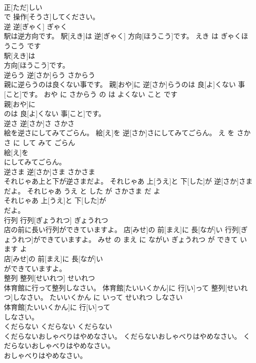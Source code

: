 \documentclass[8pt]{extreport}
\begin{document}
\begin{CJK}{UTF8}{min}
\\	正[ただ]しい
\\	で 操作[そうさ]してください。			
\\	逆	逆[ぎゃく]	ぎゃく	
\\	駅は逆方向です。	駅[えき]は 逆[ぎゃく] 方向[ほうこう]です。	えき は ぎゃくほうこう です	
\\	駅[えき]は
\\	方向[ほうこう]です。			
\\	逆らう	逆[さか]らう	さからう	
\\	親に逆らうのは良くない事です。	親[おや]に 逆[さか]らうのは 良[よ]くない 事[こと]です。	おや に さからう の は よくない こと です	
\\	親[おや]に
\\	のは 良[よ]くない 事[こと]です。			
\\	逆さ	逆[さか]さ	さかさ	
\\	絵を逆さにしてみてごらん。	絵[え]を 逆[さか]さにしてみてごらん。	え を さかさ に して みて ごらん	
\\	絵[え]を
\\	にしてみてごらん。			
\\	逆さま	逆[さか]さま	さかさま	
\\	それじゃあ上と下が逆さまだよ。	それじゃあ 上[うえ]と 下[した]が 逆[さか]さまだよ。	それじゃあ うえ と した が さかさま だ よ	
\\	それじゃあ 上[うえ]と 下[した]が
\\	だよ。			
\\	行列	行列[ぎょうれつ]	ぎょうれつ	
\\	店の前に長い行列ができていますよ。	店[みせ]の 前[まえ]に 長[なが]い 行列[ぎょうれつ]ができていますよ。	みせ の まえ に ながい ぎょうれつ が できて います よ	
\\	店[みせ]の 前[まえ]に 長[なが]い
\\	ができていますよ。			
\\	整列	整列[せいれつ]	せいれつ	
\\	体育館に行って整列しなさい。	体育館[たいいくかん]に 行[い]って 整列[せいれつ]しなさい。	たいいくかん に いって せいれつ しなさい	
\\	体育館[たいいくかん]に 行[い]って
\\	しなさい。			
\\	くだらない	くだらない	くだらない	
\\	くだらないおしゃべりはやめなさい。	くだらないおしゃべりはやめなさい。	くだらないおしゃべりはやめなさい。	
\\	おしゃべりはやめなさい。			

\end{CJK}
\end{document}

